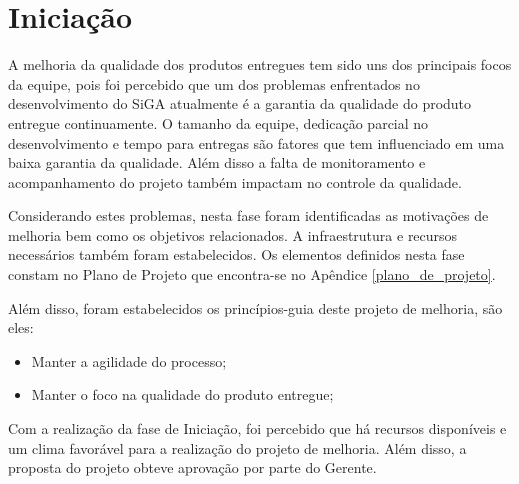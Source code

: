 \chapter{Iniciação} \label{cap:iniciacao}

A melhoria da qualidade dos produtos entregues tem sido uns dos principais focos da equipe, pois 
foi percebido que um dos problemas enfrentados 
no desenvolvimento do SiGA atualmente é a garantia da qualidade
do produto entregue continuamente. O tamanho da equipe, dedicação parcial no
desenvolvimento e tempo para entregas são fatores que tem influenciado em uma baixa garantia da qualidade. 
Além disso a falta de monitoramento e acompanhamento do projeto também impactam no controle da qualidade. 

Considerando estes problemas, nesta fase foram identificadas as motivações de melhoria bem como os objetivos relacionados. 
A infraestrutura e recursos necessários também foram estabelecidos. 
Os elementos definidos nesta fase constam no Plano de Projeto que encontra-se no Apêndice \ref{plano_de_projeto}. 

Além disso, foram estabelecidos os princípios-guia deste projeto de melhoria, são eles:

\begin{itemize}
 \item Manter a agilidade do processo;
 \item Manter o foco na qualidade do produto entregue;
\end{itemize}

Com a realização da fase de Iniciação, foi percebido que há recursos disponíveis e um clima favorável para a realização do projeto de melhoria.
Além disso, a proposta do projeto obteve aprovação por parte do Gerente.